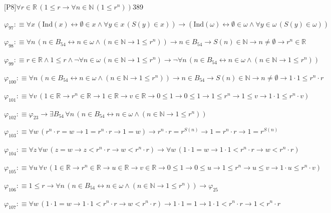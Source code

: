 \begin{fullproof}{[P8]}{$\forall r \in \mathbb{R}\,(1 \leq r \to \forall n \in \mathbb{N}\,(1 \leq {{r}^{n}}))$}{389}
\begin{abbrevlist}
\item $\varphi_{97} :\equiv \forall x\,(\mathrm{Ind}(x) \leftrightarrow \emptyset \in x \land \forall y \in x\,(S(y) \in x)) \to (\mathrm{Ind}(\omega) \leftrightarrow \emptyset \in \omega \land \forall y \in \omega\,(S(y) \in \omega))$
\item $\varphi_{98} :\equiv \forall n\,(n \in B_{54} \leftrightarrow n \in \omega \land (n \in \mathbb{N} \to 1 \leq {{r}^{n}})) \to n \in B_{54} \to S(n) \in \mathbb{N} \to n \neq \emptyset \to {{r}^{n}} \in \mathbb{R}$
\item $\varphi_{99} :\equiv r \in \mathbb{R} \land 1 \leq r \land \neg \forall n \in \omega\,(n \in \mathbb{N} \to 1 \leq {{r}^{n}}) \to \neg \forall n\,(n \in B_{54} \leftrightarrow n \in \omega \land (n \in \mathbb{N} \to 1 \leq {{r}^{n}}))$
\item $\varphi_{100} :\equiv \forall n\,(n \in B_{54} \leftrightarrow n \in \omega \land (n \in \mathbb{N} \to 1 \leq {{r}^{n}})) \to n \in B_{54} \to S(n) \in \mathbb{N} \to n \neq \emptyset \to 1 \cdot 1 \leq {{r}^{n}} \cdot r$
\item $\varphi_{101} :\equiv \forall v\,(1 \in \mathbb{R} \to {{r}^{n}} \in \mathbb{R} \to 1 \in \mathbb{R} \to v \in \mathbb{R} \to 0 \leq 1 \to 0 \leq 1 \to 1 \leq {{r}^{n}} \to 1 \leq v \to 1 \cdot 1 \leq {{r}^{n}} \cdot v)$
\item $\varphi_{102} :\equiv \varphi_{23} \to \exists B_{54}\,\forall n\,(n \in B_{54} \leftrightarrow n \in \omega \land (n \in \mathbb{N} \to 1 \leq {{r}^{n}}))$
\item $\varphi_{103} :\equiv \forall w\,({{r}^{n}} \cdot r = w \to 1 = {{r}^{n}} \cdot r \to 1 = w) \to {{r}^{n}} \cdot r = {{r}^{S(n)}} \to 1 = {{r}^{n}} \cdot r \to 1 = {{r}^{S(n)}}$
\item $\varphi_{104} :\equiv \forall z\,\forall w\,(z = w \to z < {{r}^{n}} \cdot r \to w < {{r}^{n}} \cdot r) \to \forall w\,(1 \cdot 1 = w \to 1 \cdot 1 < {{r}^{n}} \cdot r \to w < {{r}^{n}} \cdot r)$
\item $\varphi_{105} :\equiv \forall u\,\forall v\,(1 \in \mathbb{R} \to {{r}^{n}} \in \mathbb{R} \to u \in \mathbb{R} \to v \in \mathbb{R} \to 0 \leq 1 \to 0 \leq u \to 1 \leq {{r}^{n}} \to u \leq v \to 1 \cdot u \leq {{r}^{n}} \cdot v)$
\item $\varphi_{106} :\equiv 1 \leq r \to \forall n\,(n \in B_{54} \leftrightarrow n \in \omega \land (n \in \mathbb{N} \to 1 \leq {{r}^{n}})) \to \varphi_{25}$
\item $\varphi_{107} :\equiv \forall w\,(1 \cdot 1 = w \to 1 \cdot 1 < {{r}^{n}} \cdot r \to w < {{r}^{n}} \cdot r) \to 1 \cdot 1 = 1 \to 1 \cdot 1 < {{r}^{n}} \cdot r \to 1 < {{r}^{n}} \cdot r$

\end{abbrevlist}
\end{fullproof}
